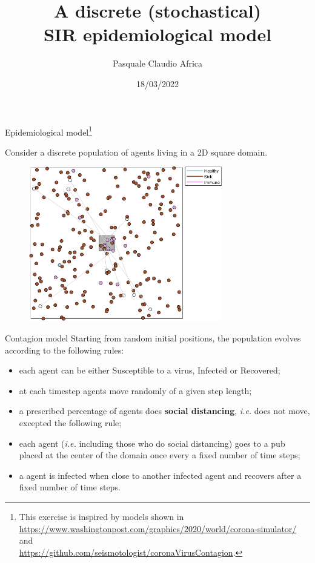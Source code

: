 \documentclass[10pt]{beamer}
\begin{document}
    \title{A discrete (stochastical)\protect\\SIR epidemiological model}
    \author{Pasquale Claudio Africa}
    \date{18/03/2022}
    
\begin{frame}
    \maketitle
\end{frame}

\begin{frame}{Epidemiological model\footnote{This exercise is inspired by models shown in \\
\url{https://www.washingtonpost.com/graphics/2020/world/corona-simulator/} and \\
\url{https://github.com/seismotologist/coronaVirusContagion}.}}

Consider a discrete population of agents living in a 2D square domain.

\begin{figure}
    \includegraphics[width=0.75\textwidth]{contagion.png}
\end{figure}
\end{frame}

\begin{frame}{Contagion model}
Starting from random initial positions, the population evolves according to the following rules:

\begin{itemize}
    \item each agent can be either Susceptible to a virus, Infected or Recovered;
    \item at each timestep agents move randomly of a given step length;
    \item a prescribed percentage of agents does \textbf{social distancing}, \textit{i.e.} does not move, excepted the following rule;
    \item each agent (\textit{i.e.} including those who do social distancing) goes to a pub placed at the center of the domain once every a fixed number of time steps;
    \item a agent is infected when close to another infected agent and recovers after a fixed number of time steps.
\end{itemize}
\end{frame}
\end{document}
